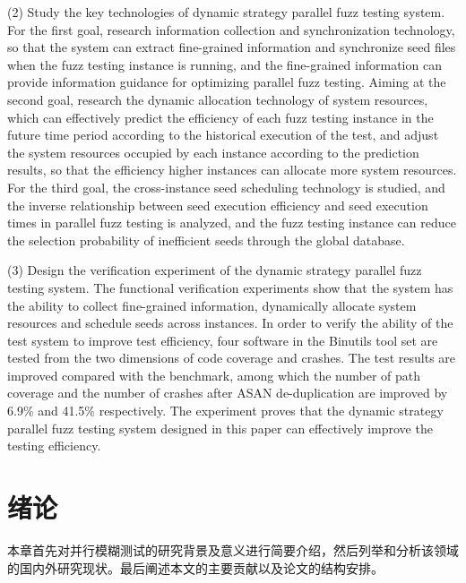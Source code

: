 \documentclass[master]{thesis-uestc}
\begin{document}
\begin{englishabstract}
(2) Study the key technologies of dynamic strategy parallel fuzz testing system. For the first goal, research information collection and synchronization technology, so that the system can extract fine-grained information and synchronize seed files when the fuzz testing instance is running, and the fine-grained information can provide information guidance for optimizing parallel fuzz testing. Aiming at the second goal, research the dynamic allocation technology of system resources, which can effectively predict the efficiency of each fuzz testing instance in the future time period according to the historical execution of the test, and adjust the system resources occupied by each instance according to the prediction results, so that the efficiency higher instances can allocate more system resources. For the third goal, the cross-instance seed scheduling technology is studied, and the inverse relationship between seed execution efficiency and seed execution times in parallel fuzz testing is analyzed, and the fuzz testing instance can reduce the selection probability of inefficient seeds through the global database.

(3) Design the verification experiment of the dynamic strategy parallel fuzz testing system. The functional verification experiments show that the system has the ability to collect fine-grained information, dynamically allocate system resources and schedule seeds across instances. In order to verify the ability of the test system to improve test efficiency, four software in the Binutils tool set are tested from the two dimensions of code coverage and crashes. The test results are improved compared with the benchmark, among which the number of path coverage and the number of crashes after ASAN de-duplication are improved by 6.9\% and 41.5\% respectively. The experiment proves that the dynamic strategy parallel fuzz testing system designed in this paper can effectively improve the testing efficiency.

\end{englishabstract}

\thesistableofcontents %

\chapter{绪\hspace{6pt}论}
本章首先对并行模糊测试的研究背景及意义进行简要介绍，然后列举和分析该领域的国内外研究现状。最后阐述本文的主要贡献以及论文的结构安排。
\end{document}
